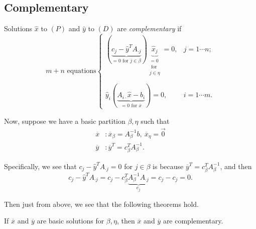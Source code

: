 \subsection{Complementary}
Solutions \(\hat{x}\) to \((P)\) and \(\hat{y}\) to \((D)\) are \emph{complementary} if
\[
	m+n\text{ equations}\begin{cases}
		(\underbrace{c_{j} - \hat{y}^{T} A_{\cdot j}}_{ = 0\text{ for }j\in \beta}) \underbrace{\hat{x}_j}_{ \substack{= 0 \\\text{ for }\\j\in \eta}} = 0, & j = 1\cdots n; \\\\
		\hat{y}_i(\underbrace{A_{i\cdot} \hat{x} - b_{i}}_{ = 0 \text{ for }\overline{x}}) = 0, & i = 1\cdots m.
	\end{cases}
\]

Now, suppose we have a basic partition \(\beta, \eta\) such that
\[
	\begin{split}
		\overline{x}&: \overline{x}_{\beta} = A^{-1}_{\beta}b,\ \overline{x}_{\eta} = \vec{0}\\
		\overline{y}&: \overline{y}^{T} = c^{T}_{\beta}A^{-1}_{\beta}.
	\end{split}
\]

\begin{note}
	Specifically, we see that \(c_{j} - \hat{y}^{T}A_{\cdot j} = 0\) for \(j\in\beta\) is because \(\overline{y}^{T} = c^{T}_{\beta}A^{-1}_{\beta}\), and then
	\[
		c_{j} - \hat{y}^{T}A_{\cdot j} = c_{j} - c^{T}_{\beta}\underbrace{A^{-1}_{\beta}A_{\cdot j}}_{e_{j}} = c_{j} - c_{j} = 0.
	\]
\end{note}

Then just from above, we see that the following theorems hold.
\begin{theorem}
	If \(\overline{x}\) and \(\overline{y}\) are basic solutions for \(\beta, \eta\), then \(\overline{x}\) and \(\overline{y}\) are
	complementary.
\end{theorem}

